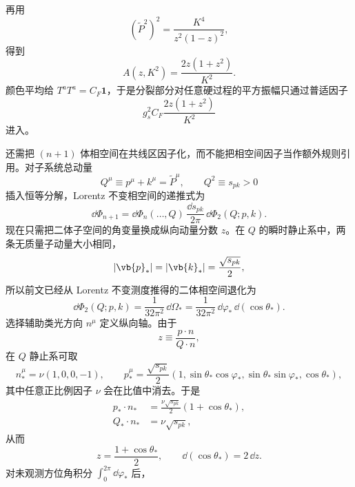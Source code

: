 \begin{derivation}[夸克共线发射的分裂概率]
再用
\begin{equation*}
 (\widetilde P^2)^2
 =\frac{K^4}{z^2(1-z)^2},
\end{equation*}
得到
\begin{equation*}
 A(z,K^2)
 =\frac{2z(1+z^2)}{K^2}.
\end{equation*}
颜色平均给 $T^aT^a=C_F\mathbf1$，于是分裂部分对任意硬过程的平方振幅只通过普适因子
\begin{equation*}
 g_s^2C_F\frac{2z(1+z^2)}{K^2}
\end{equation*}
进入。

还需把 $(n+1)$ 体相空间在共线区因子化，而不能把相空间因子当作额外规则引用。对子系统总动量
\begin{equation*}
 Q^\mu\equiv p^\mu+k^\mu=\widetilde P^\mu,
 \qquad Q^2\equiv s_{pk}>0
\end{equation*}
插入恒等分解，Lorentz 不变相空间的递推式为
\begin{equation*}
 \dd\Phi_{n+1}
 =\dd\Phi_n(\ldots,Q)\,
 \frac{\dd s_{pk}}{2\pi}\,
 \dd\Phi_2(Q;p,k).
\end{equation*}
现在只需把二体子空间的角变量换成纵向动量分数 $z$。在 $Q$ 的瞬时静止系中，两条无质量子动量大小相同，
\begin{equation*}
 |\vb{p}_*|=|\vb{k}_*|=\frac{\sqrt{s_{pk}}}{2},
\end{equation*}
所以前文已经从 Lorentz 不变测度推得的二体相空间退化为
\begin{equation*}
 \dd\Phi_2(Q;p,k)
 =\frac{1}{32\pi^2}\,\dd\Omega_*
 =\frac{1}{32\pi^2}\,\dd\varphi_*\,\dd(\cos\theta_*).
\end{equation*}
选择辅助类光方向 $n^\mu$ 定义纵向轴。由于
\begin{equation*}
 z\equiv\frac{p\cdot n}{Q\cdot n},
\end{equation*}
在 $Q$ 静止系可取
\begin{equation*}
 n_*^\mu=\nu(1,0,0,-1),
 \qquad
 p_*^\mu=\frac{\sqrt{s_{pk}}}{2}
 (1,\sin\theta_*\cos\varphi_*,\sin\theta_*\sin\varphi_*,\cos\theta_*),
\end{equation*}
其中任意正比例因子 $\nu$ 会在比值中消去。于是
\begin{align*}
 p_*\cdot n_*
 &=\frac{\nu\sqrt{s_{pk}}}{2}(1+\cos\theta_*),\\
 Q_*\cdot n_*
 &=\nu\sqrt{s_{pk}},
\end{align*}
从而
\begin{equation*}
 z=\frac{1+\cos\theta_*}{2},
 \qquad
 \dd(\cos\theta_*)=2\,\dd z.
\end{equation*}
对未观测方位角积分 $\int_0^{2\pi}\dd\varphi_*$ 后，

\end{derivation}

